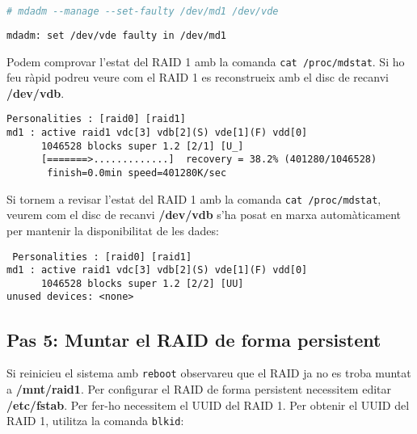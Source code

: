 \begin{lstlisting}[language=bash, numbers=none, commentstyle=\color{black}]
# mdadm --manage --set-faulty /dev/md1 /dev/vde
\end{lstlisting}

\begin{terminaloutput}
\footnotesize\begin{verbatim}
mdadm: set /dev/vde faulty in /dev/md1
\end{verbatim}
\end{terminaloutput}

Podem comprovar l'estat del RAID 1 amb la comanda \texttt{cat /proc/mdstat}. Si ho feu ràpid podreu veure com el RAID 1 es reconstrueix amb el disc de recanvi \textbf{/dev/vdb}.

\begin{terminaloutput}
\footnotesize\begin{verbatim}
Personalities : [raid0] [raid1]
md1 : active raid1 vdc[3] vdb[2](S) vde[1](F) vdd[0]
      1046528 blocks super 1.2 [2/1] [U_]
      [=======>.............]  recovery = 38.2% (401280/1046528)
       finish=0.0min speed=401280K/sec
\end{verbatim}
\normalsize
\end{terminaloutput}

Si tornem a revisar l'estat del RAID 1 amb la comanda \texttt{cat /proc/mdstat}, veurem com el disc de recanvi \textbf{/dev/vdb} s'ha posat en marxa automàticament per mantenir la disponibilitat de les dades:

\begin{terminaloutput}
\footnotesize\begin{verbatim}
 Personalities : [raid0] [raid1]
md1 : active raid1 vdc[3] vdb[2](S) vde[1](F) vdd[0]
      1046528 blocks super 1.2 [2/2] [UU]
unused devices: <none>
\end{verbatim}
\end{terminaloutput}

\subsection{Pas 5: Muntar el RAID de forma
persistent}\label{pas-5-muntar-la-raid-de-forma-persistent}

Si reinicieu el sistema amb \texttt{reboot} observareu que el RAID ja no es troba muntat a \textbf{/mnt/raid1}. Per configurar el RAID de forma persistent necessitem editar \textbf{/etc/fstab}. Per fer-ho necessitem el UUID del RAID 1. Per obtenir el UUID del RAID 1, utilitza la comanda \texttt{blkid}:

